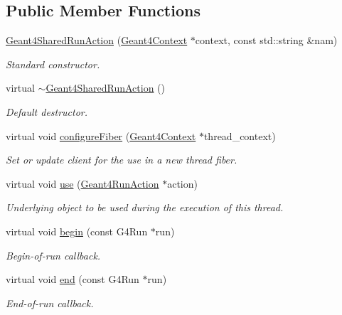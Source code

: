 \subsection*{Public Member Functions}
\begin{DoxyCompactItemize}
\item 
\hyperlink{class_d_d4hep_1_1_simulation_1_1_geant4_shared_run_action_aeb1d4859106fe1d968a4433b2630561a}{Geant4SharedRunAction} (\hyperlink{class_d_d4hep_1_1_simulation_1_1_geant4_context}{Geant4Context} $\ast$context, const std::string \&nam)
\begin{DoxyCompactList}\small\item\em Standard constructor. \item\end{DoxyCompactList}\item 
virtual \hyperlink{class_d_d4hep_1_1_simulation_1_1_geant4_shared_run_action_a519c22826231728b12792015e2a96837}{$\sim$Geant4SharedRunAction} ()
\begin{DoxyCompactList}\small\item\em Default destructor. \item\end{DoxyCompactList}\item 
virtual void \hyperlink{class_d_d4hep_1_1_simulation_1_1_geant4_shared_run_action_a6077a3ce7deb655ef76d4fe4e8dc1b19}{configureFiber} (\hyperlink{class_d_d4hep_1_1_simulation_1_1_geant4_context}{Geant4Context} $\ast$thread\_\-context)
\begin{DoxyCompactList}\small\item\em Set or update client for the use in a new thread fiber. \item\end{DoxyCompactList}\item 
virtual void \hyperlink{class_d_d4hep_1_1_simulation_1_1_geant4_shared_run_action_ae0502a99bbdefd87e3b32e5046294585}{use} (\hyperlink{class_d_d4hep_1_1_simulation_1_1_geant4_run_action}{Geant4RunAction} $\ast$action)
\begin{DoxyCompactList}\small\item\em Underlying object to be used during the execution of this thread. \item\end{DoxyCompactList}\item 
virtual void \hyperlink{class_d_d4hep_1_1_simulation_1_1_geant4_shared_run_action_a8206dc20bbe8ace921f4e97c7159872a}{begin} (const G4Run $\ast$run)
\begin{DoxyCompactList}\small\item\em Begin-\/of-\/run callback. \item\end{DoxyCompactList}\item 
virtual void \hyperlink{class_d_d4hep_1_1_simulation_1_1_geant4_shared_run_action_af723af818fd7798e910dcfef30092345}{end} (const G4Run $\ast$run)
\begin{DoxyCompactList}\small\item\em End-\/of-\/run callback. \item\end{DoxyCompactList}\end{DoxyCompactItemize}
